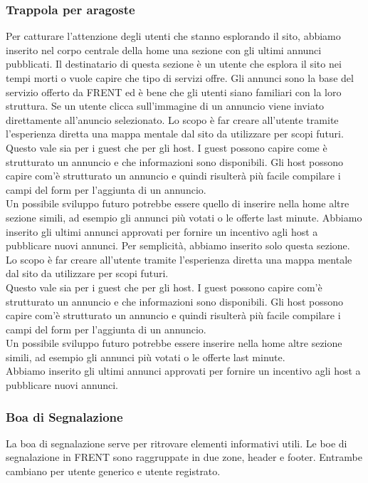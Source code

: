 \documentclass[1_relazione.tex]{subfiles}
\begin{document}
\subsubsection{Trappola per aragoste} 
Per catturare l'attenzione degli utenti che stanno esplorando il sito, abbiamo inserito nel corpo centrale della home una sezione con gli ultimi annunci pubblicati. Il destinatario di questa sezione è un utente che esplora il sito nei tempi morti o vuole capire che tipo di servizi offre. Gli annunci sono la base del servizio offerto da FRENT ed è bene che gli utenti siano familiari con la loro struttura. Se un utente clicca sull'immagine di un annuncio viene inviato direttamente all'anuncio selezionato. Lo scopo è far creare all'utente tramite l'esperienza diretta una mappa mentale dal sito da utilizzare per scopi futuri. \\
Questo vale sia per i guest che per gli host. I guest possono capire come è strutturato un annuncio e che informazioni sono disponibili. Gli host possono capire com'è strutturato un annuncio e quindi risulterà più facile compilare i campi del form per l'aggiunta di un annuncio. \\
Un possibile sviluppo futuro potrebbe essere quello di inserire nella home altre sezione simili, ad esempio gli annunci più votati o le offerte last minute. Abbiamo inserito gli ultimi annunci approvati per fornire un incentivo agli host a pubblicare nuovi annunci. Per semplicità, abbiamo inserito solo questa sezione. \\

Lo scopo \`{e} far creare all'utente tramite l'esperienza diretta una mappa mentale dal sito da utilizzare per scopi futuri. \\
Questo vale sia per i guest che per gli host. I guest possono capire com'\`{e} strutturato un annuncio e che informazioni sono disponibili. Gli host possono capire com'\`{e} strutturato un annuncio e quindi risulter\`{a} pi\`{u} facile compilare i campi del form per l'aggiunta di un annuncio. \\
Un possibile sviluppo futuro potrebbe essere inserire nella home altre sezione simili, ad esempio gli annunci pi\`{u} votati o le offerte last minute.\\ Abbiamo inserito gli ultimi annunci approvati per fornire un incentivo agli host a pubblicare nuovi annunci. \\

\subsubsection{Boa di Segnalazione}
La boa di segnalazione serve per ritrovare elementi informativi utili. Le boe di segnalazione in FRENT sono raggruppate in due zone, header e footer. Entrambe cambiano per utente generico e utente registrato.
\end{document}
